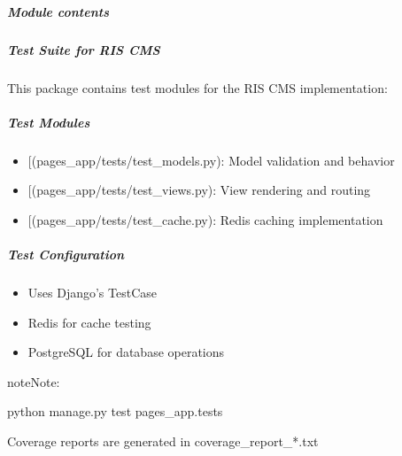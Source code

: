 \documentclass[letterpaper,10pt,english]{sphinxmanual}
\begin{document}
\subparagraph{Module contents}
\label{\detokenize{pages_app.tests:module-pages_app.tests}}\label{\detokenize{pages_app.tests:module-contents}}

\subparagraph{Test Suite for RIS CMS}
\label{\detokenize{pages_app.tests:test-suite-for-ris-cms}}
\sphinxAtStartPar
This package contains test modules for the RIS CMS implementation:


\subparagraph{Test Modules}
\label{\detokenize{pages_app.tests:test-modules}}\begin{itemize}
\item {} 
\sphinxAtStartPar
{[}\sphinxtitleref{test\_models.py}{]}(pages\_app/tests/test\_models.py): Model validation and behavior

\item {} 
\sphinxAtStartPar
{[}\sphinxtitleref{test\_views.py}{]}(pages\_app/tests/test\_views.py): View rendering and routing

\item {} 
\sphinxAtStartPar
{[}\sphinxtitleref{test\_cache.py}{]}(pages\_app/tests/test\_cache.py): Redis caching implementation

\end{itemize}


\subparagraph{Test Configuration}
\label{\detokenize{pages_app.tests:test-configuration}}\begin{itemize}
\item {} 
\sphinxAtStartPar
Uses Django’s TestCase

\item {} 
\sphinxAtStartPar
Redis for cache testing

\item {} 
\sphinxAtStartPar
PostgreSQL for database operations

\end{itemize}

\begin{sphinxadmonition}{note}{Note:}\begin{description}
\sphinxAtStartPar
python manage.py test pages\_app.tests

\end{description}

\sphinxAtStartPar
Coverage reports are generated in coverage\_report\_*.txt
\end{sphinxadmonition}
\end{document}
